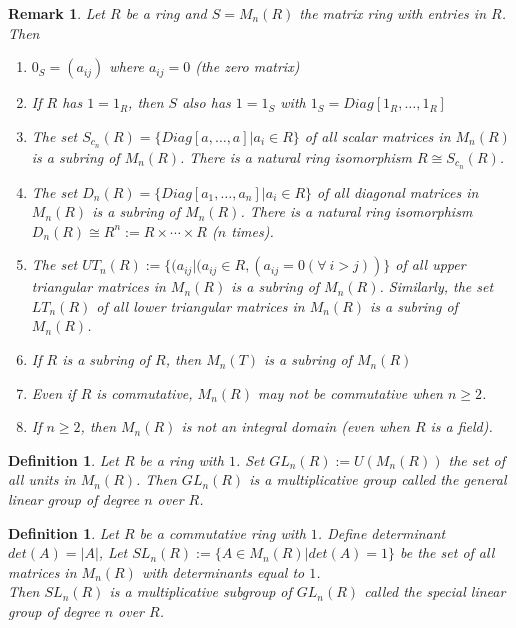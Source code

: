 \documentclass[a4paper,8pt]{article}
\theoremstyle{theorem}
\newtheorem{definition}[theorem]{Definition}
\newtheorem{remark}[theorem]{Remark}
\begin{document}
\begin{remark}
Let $R$ be a ring and $S = M_n(R)$ the matrix ring with entries in $R$. Then
\begin{enumerate}[label=(\roman*)]
\item $0_S=(a_{ij})$ where $a_{ij} = 0$ (the zero matrix)
\item If $R$ has $1 = 1_R$, then $S$ also has $1 = 1_S$ with $1_S = Diag[1_R, \ldots, 1_R]$
\item The set $S_{c_n}(R) = \{Diag[a, \ldots, a] | a_i \in R\}$ of all scalar matrices in $M_n(R)$ is a subring of $M_n(R)$. There is a natural ring isomorphism $R \cong S_{c_n}(R)$.
\item The set $D_n(R) = \{Diag[a_1, \ldots, a_n] | a_i \in R\}$ of all diagonal matrices in $M_n(R)$ is a subring of $M_n(R)$. There is a natural ring isomorphism $D_n(R) \cong R^n := R \times \cdots \times R $ ($n$ times).
\item The set $UT_n(R):= \{(a_{ij} | (a_{ij} \in R, (a_{ij} = 0 (\forall \ i > j))\}$ of all upper triangular matrices in $M_n(R)$ is a subring of $M_n(R)$. Similarly, the set $LT_n(R)$ of all lower triangular matrices in $M_n(R)$ is a subring of $M_n(R)$.
\item If $R$ is a subring of $R$, then $M_n(T)$ is a subring of $M_n(R)$
\item Even if $R$ is commutative, $M_n(R)$ may not be commutative when $n \geq 2$.
\item If $n \geq 2$, then $M_n(R)$ is not an integral domain (even when $R$ is a field).
\end{enumerate}
\end{remark}


\begin{definition}
Let $R$ be a ring with $1$. Set $GL_n(R) := U(M_n(R))$ the set of all units in $M_n(R)$. Then $GL_n(R)$ is a multiplicative group called the \textit{{\color{blue} general linear group of degree $n$ over $R$}}.
\end{definition}


\begin{definition}
Let $R$ be a commutative ring with $1$. Define determinant $det(A) = \left| A \right|$, Let $SL_n(R) := \{A \in M_n(R) | det(A) = 1\}$ be the set of all matrices in $M_n(R)$ with determinants equal to $1$. \\
Then $SL_n(R)$ is a multiplicative subgroup of $GL_n(R)$ called the \textit{{\color{blue} special linear group of degree $n$ over $R$}}.
\end{definition}
\end{document}
